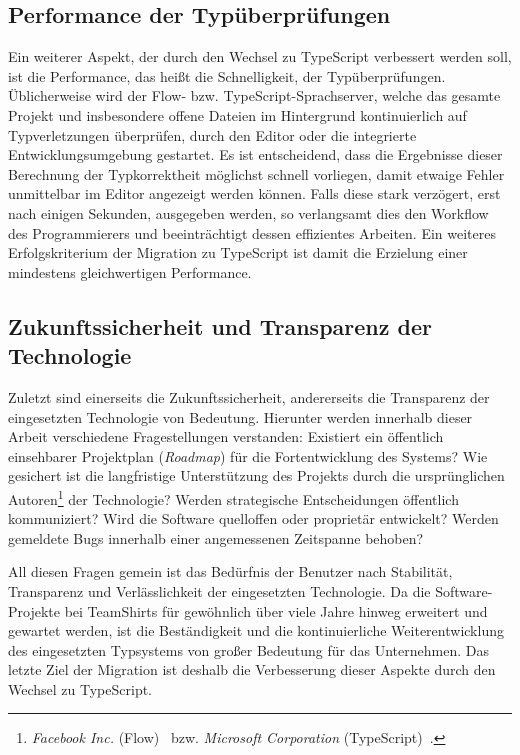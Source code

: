 \subsection{Performance der Typüberprüfungen}

Ein weiterer Aspekt, der durch den Wechsel zu TypeScript verbessert werden soll, ist die Performance, das heißt die Schnelligkeit, der Typüberprüfungen. Üblicherweise wird der Flow- bzw. TypeScript-Sprachserver, welche das gesamte Projekt und insbesondere offene Dateien im Hintergrund kontinuierlich auf Typverletzungen überprüfen, durch den Editor oder die integrierte Entwicklungsumgebung gestartet. Es ist entscheidend, dass die Ergebnisse dieser Berechnung der Typkorrektheit möglichst schnell vorliegen, damit etwaige Fehler unmittelbar im Editor angezeigt werden können. Falls diese stark verzögert, erst nach einigen Sekunden, ausgegeben werden, so verlangsamt dies den Workflow des Programmierers und beeinträchtigt dessen effizientes Arbeiten. Ein weiteres Erfolgskriterium der Migration zu TypeScript ist damit die Erzielung einer mindestens gleichwertigen Performance.

\subsection{Zukunftssicherheit und Transparenz der Technologie}

Zuletzt sind einerseits die Zukunftssicherheit, andererseits die Transparenz der eingesetzten Technologie von Bedeutung.
Hierunter werden innerhalb dieser Arbeit verschiedene Fragestellungen verstanden: Existiert ein öffentlich einsehbarer Projektplan (\textit{Roadmap}) für die Fortentwicklung des Systems? Wie gesichert ist die langfristige Unterstützung des Projekts durch die ursprünglichen Autoren\footnote{\textit{Facebook Inc.} (Flow)~\autocite{FLOW:PAPER} bzw. \emph{Microsoft Corporation} (TypeScript)~\autocite{TYPESCRIPT:SPEC}.} der Technologie? Werden strategische Entscheidungen öffentlich kommuniziert? Wird die Software quelloffen oder proprietär entwickelt? Werden gemeldete Bugs innerhalb einer angemessenen Zeitspanne behoben?

All diesen Fragen gemein ist das Bedürfnis der Benutzer nach Stabilität, Transparenz und Verlässlichkeit der eingesetzten Technologie. Da die Software-Projekte bei TeamShirts für gewöhnlich über viele Jahre hinweg erweitert und gewartet werden, ist die Beständigkeit und die kontinuierliche Weiterentwicklung des eingesetzten Typsystems von großer Bedeutung für das Unternehmen. Das letzte Ziel der Migration ist deshalb die Verbesserung dieser Aspekte durch den Wechsel zu TypeScript.

